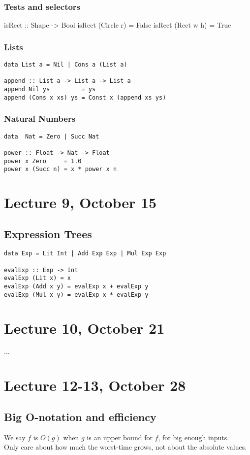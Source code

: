 \documentclass{article}
\begin{document}
\subsubsection{Tests and selectors}
isRect :: Shape -> Bool
isRect (Circle r) = False
isRect (Rect w h) = True
\subsubsection{Lists}
\begin{verbatim}
data List a = Nil | Cons a (List a)

append :: List a -> List a -> List a
append Nil ys         = ys
append (Cons x xs) ys = Const x (append xs ys)
\end{verbatim}
\subsubsection{Natural Numbers}
\begin{verbatim}
data  Nat = Zero | Succ Nat

power :: Float -> Nat -> Float
power x Zero     = 1.0
power x (Succ n) = x * power x n
\end{verbatim}
\section{Lecture 9, October 15}
\subsection{Expression Trees}
\begin{verbatim}
data Exp = Lit Int | Add Exp Exp | Mul Exp Exp

evalExp :: Exp -> Int
evalExp (Lit x) = x
evalExp (Add x y) = evalExp x + evalExp y
evalExp (Mul x y) = evalExp x * evalExp y
\end{verbatim}
\section{Lecture 10, October 21}
... 
\section{Lecture 12-13, October 28}
\subsection{Big O-notation and efficiency}
We say $f$ is $O(g)$ when $g$ is an upper bound for $f$, for big enough inputs.\\ 
Only care about how much the worst-time grows, not about the absolute values.
\end{document}

